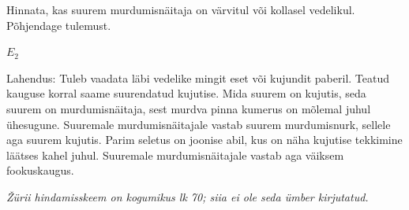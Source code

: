 
Hinnata, kas suurem murdumisnäitaja on värvitul või kollasel vedelikul. Põhjendage tulemust.

\hint

\solu
$E_2$

Lahendus: Tuleb vaadata läbi vedelike mingit eset või kujundit paberil. Teatud kauguse korral saame suurendatud kujutise. Mida suurem on kujutis, seda suurem on murdumisnäitaja, sest murdva pinna kumerus on mõlemal juhul ühesugune. Suuremale murdumisnäitajale vastab suurem murdumisnurk, sellele aga suurem kujutis. Parim seletus on joonise abil, kus on näha kujutise tekkimine läätses kahel juhul. Suuremale murdumisnäitajale vastab aga väiksem fookuskaugus.

\textit{Žürii hindamisskeem on kogumikus lk 70; siia ei ole seda ümber kirjutatud.}
\probend
